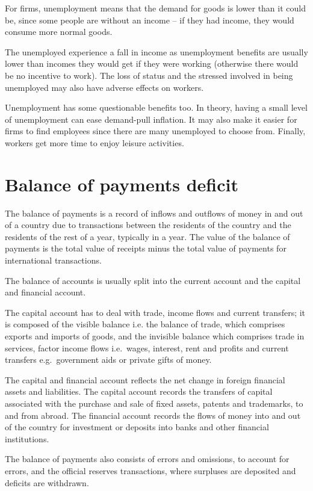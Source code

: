 \documentclass[Economics.tex]{subfiles}
\begin{document}
For firms, unemployment means that the demand for goods is lower than it could be, since some people are without an income -- if they had income, they would consume more normal goods. 

The unemployed experience a fall in income as unemployment benefits are usually lower than incomes they would get if they were working (otherwise there would be no incentive to work). The loss of status and the stressed involved in being unemployed may also have adverse effects on workers.

Unemployment has some questionable benefits too. In theory, having a small level of unemployment can ease demand-pull inflation. It may also make it easier for firms to find employees since there are many unemployed to choose from. Finally, workers get more time to enjoy leisure activities.
\section{Balance of payments deficit}
The balance of payments is a record of inflows and outflows of money in and out of a country due to transactions between the residents of the country and the residents of the rest of a year, typically in a year. The value of the balance of payments is the total value of receipts minus the total value of payments for international transactions.

The balance of accounts is usually split into the current account and the capital and financial account.

The capital account has to deal with trade, income flows and current transfers; it is composed of the visible balance i.e. the balance of trade, which comprises exports and imports of goods, and the invisible balance which comprises trade in services, factor income flows i.e.\ wages, interest, rent and profits and current transfers e.g.\ government aids or private gifts of money.

The capital and financial account reflects the net change in foreign financial assets and liabilities. The capital account records the transfers of capital associated with the purchase and sale of fixed assets, patents and trademarks, to and from abroad. The financial account records the flows of money into and out of the country for investment or deposits into banks and other financial institutions.

The balance of payments also consists of errors and omissions, to account for errors, and the official reserves transactions, where surpluses are deposited and deficits are withdrawn.
\end{document}
